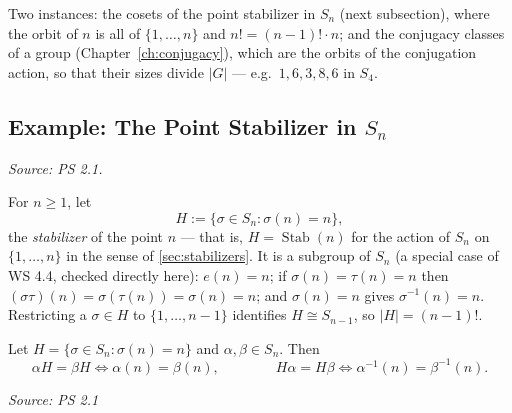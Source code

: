 \documentclass[11pt]{report}
\newcommand{\srcline}[1]{\par\hfill{\footnotesize\textit{Source: #1}}}
\begin{document}
\begin{rembox}\label{rem:where-orbit-stabilizer-has-already-appeared}
Two instances: the cosets of the point stabilizer in $S_n$ (next subsection), where the orbit of $n$ is all of $\{1, \ldots, n\}$ and $n! = (n-1)! \cdot n$; and the conjugacy classes of a group (Chapter~\ref{ch:conjugacy}), which are the orbits of the conjugation action, so that their sizes divide $|G|$ --- e.g.\ $1, 6, 3, 8, 6$ in $S_4$.
\end{rembox}





\subsection{\texorpdfstring{Example: The Point Stabilizer in $S_n$}{Example: The Point Stabilizer in Sₙ}}

\textit{Source: PS 2.1.}

\begin{defbox}\label{def:point-stabilizer-sn}
For $n \geq 1$, let
\[ H := \{ \sigma \in S_n : \sigma(n) = n \}, \]
the \emph{stabilizer} of the point $n$ --- that is, $H = \operatorname{Stab}(n)$ for the action of $S_n$ on $\{1, \ldots, n\}$ in the sense of \ref{sec:stabilizers}. It is a subgroup of $S_n$ (a special case of WS 4.4, checked directly here): $e(n) = n$; if $\sigma(n) = \tau(n) = n$ then $(\sigma\tau)(n) = \sigma(\tau(n)) = \sigma(n) = n$; and $\sigma(n) = n$ gives $\sigma^{-1}(n) = n$. Restricting a $\sigma \in H$ to $\{1, \ldots, n-1\}$ identifies $H \cong S_{n-1}$, so $|H| = (n-1)!$.
\end{defbox}

\begin{propbox}\label{prop:left-cosets-record-alpha-n-right-cosets-record}
Let $H = \{\sigma \in S_n : \sigma(n) = n\}$ and $\alpha, \beta \in S_n$. Then
\[ \alpha H = \beta H \iff \alpha(n) = \beta(n), \qquad\qquad H\alpha = H\beta \iff \alpha^{-1}(n) = \beta^{-1}(n). \]
\srcline{PS 2.1}
\end{propbox}
\end{document}
